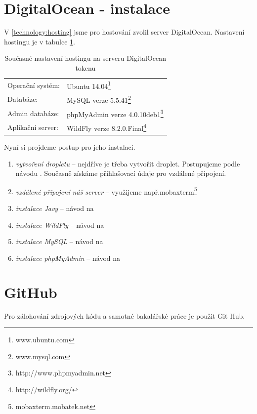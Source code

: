\documentclass[thesis=B,czech]{FITthesis}[2012/06/26]
\begin{document}
\section{DigitalOcean - instalace}

V \ref{technology:hosting} jsme pro hostování zvolil server DigitalOcean.
\newline
Nastavení hostingu je v tabulce \ref{tab:digitalocean_configure}.

\begin{table}[h!]\centering
	\caption{Současné nastavení hostingu na serveru DigitalOcean tokenu}\label{tab:digitalocean_configure}
	\begin{tabular}{l l}
		Operační systém:&Ubuntu 14.04\footnote{www.ubuntu.com}\\
		Databáze:&MySQL verze 5.5.41\footnote{www.mysql.com}\\
		Admin databáze:&phpMyAdmin verze 4.0.10deb1\footnote{http://www.phpmyadmin.net}  \\	
		Aplikační server:&WildFly verze 8.2.0.Final\footnote{http://wildfly.org/}\\	
	\end{tabular}
\end{table}

Nyní si projdeme postup pro jeho instalaci.
\begin{enumerate}[nosep]
	\item \textit{vytvoření dropletu} -- nejdříve je třeba vytvořit droplet. Postupujeme podle návodu \cite{digitalocean_droplet}. Současně získáme přihlašovací údaje pro vzdálené připojení.
	\item \textit{vzdálené připojení náš server} -- využijeme např.mobaxterm\footnote{mobaxterm.mobatek.net} 
	\item \textit{instalace Javy} -- návod na \cite{digitalocean_java} 
	\item \textit{instalace WildFly} -- návod na \cite{digitalocean_wildfly}
	\item \textit{instalace MySQL} -- návod na \cite{digitalocean_wildfly}
	\item \textit{instalace phpMyAdmin} -- návod na \cite{digitalocean_phpMyAdmin} 
\end{enumerate}

\section{GitHub}

Pro zálohování zdrojových kódu a samotné bakalářské práce je použit Git Hub.\newline 
\end{document}
